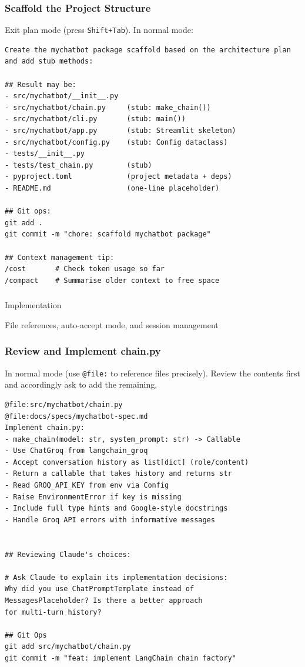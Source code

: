 \begin{frame}[fragile]\frametitle{Scaffold the Project Structure}
Exit plan mode (press \texttt{Shift+Tab}). In normal mode:

\begin{lstlisting}
Create the mychatbot package scaffold based on the architecture plan and add stub methods:

## Result may be:
- src/mychatbot/__init__.py
- src/mychatbot/chain.py     (stub: make_chain())
- src/mychatbot/cli.py       (stub: main())
- src/mychatbot/app.py       (stub: Streamlit skeleton)
- src/mychatbot/config.py    (stub: Config dataclass)
- tests/__init__.py
- tests/test_chain.py        (stub)
- pyproject.toml             (project metadata + deps)
- README.md                  (one-line placeholder)

## Git ops:
git add .
git commit -m "chore: scaffold mychatbot package"

## Context management tip:
/cost       # Check token usage so far
/compact    # Summarise older context to free space
\end{lstlisting}
\end{frame}


\begin{frame}[fragile]\frametitle{}
\begin{center}
{\Large Implementation}

{\normalsize File references, auto-accept mode, and session management}
\end{center}
\end{frame}


\begin{frame}[fragile]\frametitle{Review and Implement chain.py}
In normal mode (use \texttt{@file:} to reference files precisely). Review the contents first and accordingly ask to add the remaining.

\begin{lstlisting}
@file:src/mychatbot/chain.py
@file:docs/specs/mychatbot-spec.md
Implement chain.py:
- make_chain(model: str, system_prompt: str) -> Callable
- Use ChatGroq from langchain_groq
- Accept conversation history as list[dict] (role/content)
- Return a callable that takes history and returns str
- Read GROQ_API_KEY from env via Config
- Raise EnvironmentError if key is missing
- Include full type hints and Google-style docstrings
- Handle Groq API errors with informative messages


## Reviewing Claude's choices:

# Ask Claude to explain its implementation decisions:
Why did you use ChatPromptTemplate instead of
MessagesPlaceholder? Is there a better approach
for multi-turn history?

## Git Ops
git add src/mychatbot/chain.py
git commit -m "feat: implement LangChain chain factory"
\end{lstlisting}
\end{frame}


